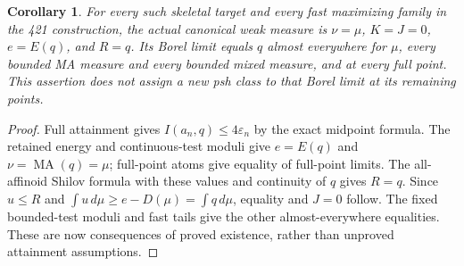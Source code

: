 \documentclass[11pt]{article}
\newtheorem{corollary}[theorem]{Corollary}
\newcommand{\MA}{\operatorname{MA}}
\begin{document}
\begin{corollary}\label{newrad:fast}
For every such skeletal target and every fast maximizing family in the
421 construction, the actual canonical weak measure is $\nu=\mu$,
$K=J=0$, $e=E(q)$, and $R=q$. Its Borel limit equals $q$ almost
everywhere for $\mu$, every bounded MA measure and every bounded mixed
measure, and at every full point. This assertion does not assign a
new psh class to that Borel limit at its remaining points.
\end{corollary}
\begin{proof}
Full attainment gives $I(a_n,q)\le4\varepsilon_n$ by the exact
midpoint formula. The retained energy and continuous-test moduli give
$e=E(q)$ and $\nu=\MA(q)=\mu$; full-point atoms give equality of
full-point limits. The all-affinoid Shilov formula with these values
and continuity of $q$ gives $R=q$. Since $u\le R$ and
$\int u\,d\mu\ge e-D(\mu)=\int q\,d\mu$, equality and $J=0$
follow. The fixed bounded-test moduli and fast tails give the other
almost-everywhere equalities. These are now consequences of proved
existence, rather than unproved attainment assumptions.
\end{proof}
\end{document}
